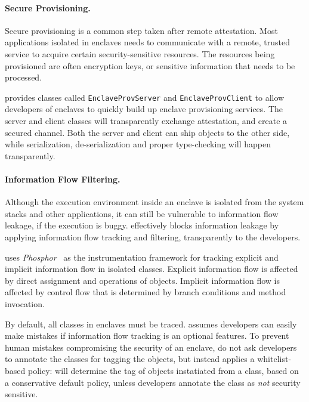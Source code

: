 \paragraph{Secure Provisioning.}
Secure provisioning is a common step taken after remote attestation.
Most applications isolated in enclaves
needs to communicate with a remote, trusted service
to acquire certain security-sensitive resources.
The resources being provisioned are often encryption keys,
or sensitive information that needs to be processed.

\sysname{} provides classes called {\tt EnclaveProvServer}
and {\tt EnclaveProvClient}
to allow developers of enclaves to quickly build up
enclave provisioning services.
The server and client classes will transparently exchange attestation,
and create a secured channel.
Both the server and client can ship \java{} objects
to the other side,
while serialization, de-serialization and proper type-checking
will happen transparently.

\paragraph{Information Flow Filtering.}
Although the execution environment inside an enclave is isolated
from the system stacks and other applications,
it can still be vulnerable to information flow leakage,
if the execution is buggy.
\sysname{} effectively blocks information leakage
by applying information flow tracking and filtering, transparently
to the developers.

\sysname{} uses {\em Phosphor}~\cite{bell2014phosphor}
as the instrumentation framework for
tracking explicit and implicit information flow in isolated \java{} classes.
Explicit information flow is affected by direct assignment
and operations of objects.
Implicit information flow is affected by control flow that is determined by
branch conditions and method invocation.

By default, all classes in enclaves must be traced.
\sysname{} assumes
developers can easily make mistakes if
information flow tracking is an optional features.
To prevent human mistakes compromising the security of an enclave,
\sysname{} do not ask developers to annotate the classes
for tagging the objects,
but instead applies a whitelist-based policy:
\sysname{} will determine the tag of objects instatiated from a class,
based on a conservative default policy,
unless developers annotate the class as {\em not} security sensitive.

